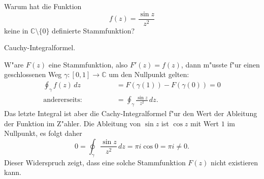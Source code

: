 Warum hat die Funktion
\[
f(z)=\frac{\sin z}{z^2}
\]
keine in $\mathbb C\setminus\{0\}$ definierte Stammfunktion?

\begin{hinweis}
Cauchy-Integralformel.
\end{hinweis}

\begin{loesung}
W"are $F(z)$ eine Stammfunktion, also $F'(z)=f(z)$,
dann m"usste f"ur einen geschlossenen
Weg $\gamma:[0,1]\to\mathbb C$ um den Nullpunkt gelten:
\begin{align*}
\oint_\gamma f(z)\,dz&=F(\gamma(1))-F(\gamma(0))=0
\\
\text{andererseits:}\qquad\qquad
&=
\oint_\gamma \frac{\sin z}{z^2}\,dz.
\end{align*}
Das letzte Integral ist aber die Cachy-Integralformel f"ur den Wert
der Ableitung der Funktion im Z"ahler. 
Die Ableitung von $\sin z$ ist $\cos z$ mit Wert $1$ im Nullpunkt,
es folgt daher
\[
0 = \oint_\gamma \frac{\sin z}{z^2}\,dz = \pi i \cos 0=\pi i\ne 0.
\]
Dieser Widerspruch zeigt, dass eine solche Stammfunktion $F(z)$ nicht
existieren kann.
\end{loesung}

